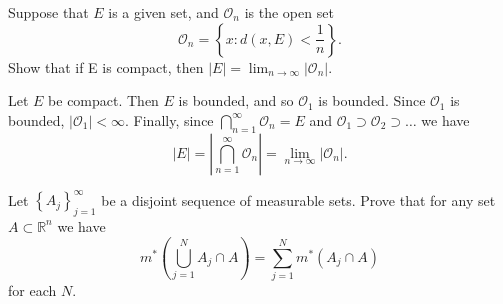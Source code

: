 \begin{solution}
\end{solution}

\pagebreak

\begin{problem}{5}
  Suppose that $E$ is a given set, and $\mathcal{O}_{n}$ is the open set
  \[
  \mathcal{O}_{n} = \left\{ x : d(x,E) < \frac{1}{n} \right\}
  .\] 
  Show that if E is compact, then $|E| = \lim_{n \to \infty} \left| \mathcal{O}_{n} \right|$.
\end{problem}

\begin{solution}
  Let $E$ be compact. 
  Then $E$ is bounded, and so $\mathcal{O}_{1}$ is bounded.
  Since $\mathcal{O}_{1}$ is bounded, $\left| \mathcal{O}_{1} \right| < \infty$.
  Finally, since $\bigcap_{n=1}^{\infty}\mathcal{O}_{n} = E$ and $\mathcal{O}_{1} \supset \mathcal{O}_{2} \supset \ldots $ we have
  \[
  \left| E \right| = \left| \bigcap_{n=1}^{\infty} \mathcal{O}_{n} \right| = \lim_{n \to \infty} \left| \mathcal{O}_{n} \right|
  .\] 

\end{solution}

\pagebreak

\begin{problem}{6}
  Let $\left\{ A_{j} \right\}_{j=1}^{\infty}$ be a disjoint sequence of measurable sets.
  Prove that for any set $A \subset \mathbb{R}^{n}$ we have 
  \[
  m^{*}\left( \bigcup_{j=1}^{N} A_{j} \cap A  \right) = \sum_{j=1}^{N} m^{*}\left( A_{j} \cap A \right)
  \] 
  for each $N$.
\end{problem}

\begin{solution}
\end{solution}

